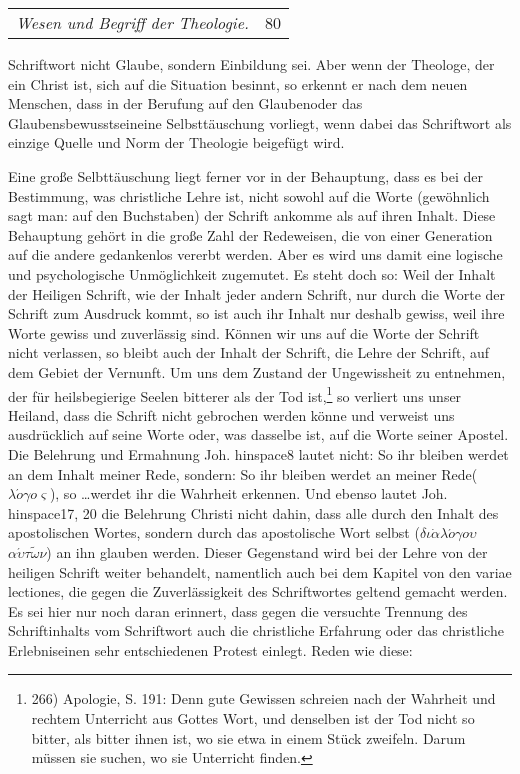 \begin{center}
\begin{tabular}{lr}
\emph{Wesen und Begriff der Theologie.} & 80
\end{tabular}
\end{center}

Schriftwort nicht Glaube, sondern Einbildung sei. Aber wenn der Theologe, der ein Christ ist, sich auf die Situation besinnt, so erkennt er nach dem neuen Menschen, dass in der Berufung auf den \glqq Glauben\grqq oder das \glqq Glaubensbewusstsein\grqq eine Selbsttäuschung vorliegt, wenn dabei das Schriftwort als einzige Quelle und Norm der Theologie beigefügt wird.

Eine große Selbttäuschung liegt ferner vor in der Behauptung, dass es bei der Bestimmung, was christliche Lehre ist, nicht sowohl auf die Worte (gewöhnlich sagt man: auf den \glqq Buchstaben\grqq) der Schrift ankomme als auf ihren \glqq Inhalt\grqq. Diese Behauptung gehört in die große Zahl der Redeweisen, die von einer Generation auf die andere gedankenlos vererbt werden. Aber es wird uns damit eine logische und psychologische Unmöglichkeit zugemutet. Es steht doch so: Weil der Inhalt der Heiligen Schrift, wie der Inhalt jeder andern Schrift, nur durch die Worte der Schrift zum Ausdruck kommt, so ist auch ihr Inhalt nur deshalb gewiss, weil ihre Worte gewiss und zuverlässig sind. Können wir uns auf die Worte der Schrift nicht verlassen, so bleibt auch der Inhalt der Schrift, die Lehre der Schrift, auf dem Gebiet der Vernunft. Um uns dem Zustand der Ungewissheit zu entnehmen, der für heilsbegierige Seelen bitterer als der Tod ist,\footnote{266) Apologie, S. 191: \glqq Denn gute Gewissen schreien nach der Wahrheit und rechtem Unterricht aus Gottes Wort, und denselben ist der Tod nicht so bitter, als bitter ihnen ist, wo sie etwa in einem Stück zweifeln. Darum müssen sie suchen, wo sie Unterricht finden.\grqq} so verliert uns unser Heiland, dass die Schrift nicht gebrochen werden könne und verweist uns ausdrücklich auf seine Worte oder, was dasselbe ist, auf die Worte seiner Apostel. Die Belehrung und Ermahnung Joh.	hinspace8 lautet nicht: \glqq So ihr bleiben werdet an dem Inhalt meiner Rede\grqq, sondern: \glqq So ihr bleiben werdet an meiner Rede\grqq ($\lambda\acute{o}\gamma o\varsigma$), so 
\ldots werdet ihr die Wahrheit erkennen. Und ebenso lautet Joh.	hinspace17, 20 die Belehrung Christi nicht dahin, dass alle durch den Inhalt des apostolischen Wortes, sondern durch das apostolische Wort selbst ($\delta\iota\dot{\alpha} \lambda\acute{o}\gamma o\upsilon$ $\alpha\acute{\upsilon}\tau\tilde{\omega}\nu$) an ihn glauben werden. Dieser Gegenstand wird bei der Lehre von der heiligen Schrift weiter behandelt, namentlich auch bei dem Kapitel von den \glqq variae lectiones\grqq, die gegen die Zuverlässigkeit des Schriftwortes geltend gemacht werden. Es sei hier nur noch daran erinnert, dass gegen die versuchte Trennung des Schriftinhalts vom Schriftwort auch die christliche Erfahrung oder das christliche \glqq Erlebnis\grqq einen sehr entschiedenen Protest einlegt. Reden wie diese: